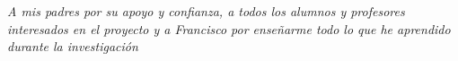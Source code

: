 \thispagestyle{empty} 				

\begin{flushright}
    \textit{A mis padres por su apoyo y confianza, a todos los alumnos y profesores interesados en el proyecto y a Francisco por enseñarme todo lo que he aprendido durante la investigación}
\end{flushright}